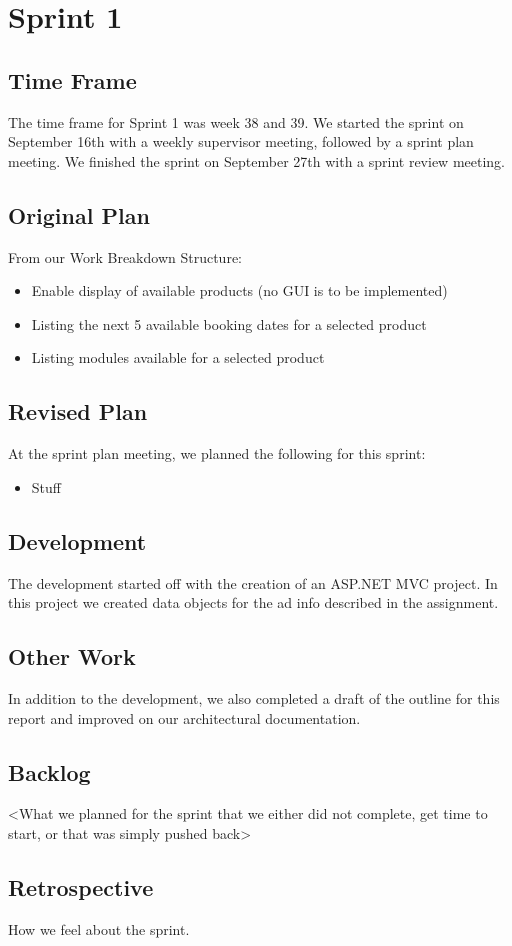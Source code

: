 \section{Sprint 1}

\subsection{Time Frame}
The time frame for Sprint 1 was week 38 and 39. We started the sprint on September 16th with a weekly supervisor meeting, followed by a sprint plan meeting. We finished the sprint on September 27th with a sprint review meeting.

\subsection{Original Plan}
From our Work Breakdown Structure:
\begin{itemize}
	\item Enable display of available products (no GUI is to be implemented)
	\item Listing the next 5 available booking dates for a selected product
	\item Listing modules available for a selected product
\end{itemize}

\subsection{Revised Plan}
At the sprint plan meeting, we planned the following for this sprint:
\begin{itemize}
	\item Stuff
\end{itemize}

\subsection{Development}
The development started off with the creation of an ASP.NET MVC project. In this project we created data objects for the ad info described in the assignment.

\subsection{Other Work}
In addition to the development, we also completed a draft of the outline for this report and improved on our architectural documentation.

\subsection{Backlog}
<What we planned for the sprint that we either did not complete, get time to start, or that was simply pushed back>

\subsection{Retrospective}
How we feel about the sprint.